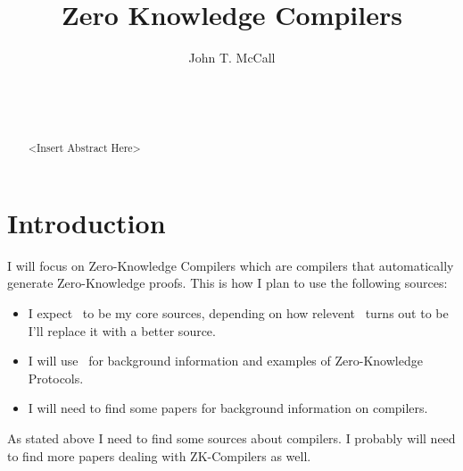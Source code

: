 \documentclass{sig-alternate}
\begin{document}

\title{Zero Knowledge Compilers}


\author{
\alignauthor
John T. McCall\\
	\\
	\\
	\\
}

\maketitle

\begin{abstract}
<Insert Abstract Here>
\end{abstract}



\section{Introduction}
	I will focus on Zero-Knowledge Compilers which are compilers that automatically generate Zero-Knowledge proofs. This is how I plan to use the following sources:
	\begin{itemize}
		\item I expect~\cite{ZKCrypt:2012, Sigma:2009, ZKPDL:2010} to be my core sources, depending on how relevent~\cite{ZKPDL:2010} turns out to be I'll replace it with a better source.
		\item I will use~\cite{MentalGame:1987, Survey, Children:1987} for background information and examples of Zero-Knowledge Protocols. 
		\item I will need to find some papers for background information on compilers.
	\end{itemize}

	As stated above I need to find some sources about compilers. I probably will need to find more papers dealing with ZK-Compilers as well.
\end{document}
